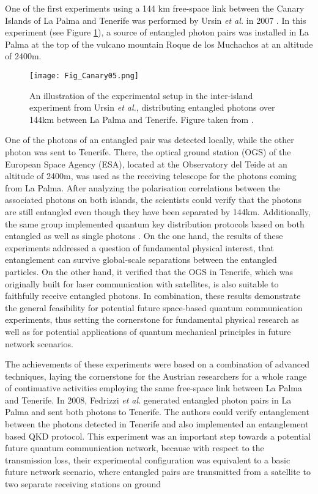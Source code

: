 \documentclass{article}
\begin{document}
One of the first experiments using a 144 km free-space link between the Canary Islands of La Palma and Tenerife was performed by Ursin \textit{et al.} in 2007 \cite{ursin2007entanglement}. In this experiment (see Figure \ref{fig:Fig_Canary05}), a source of entangled photon pairs was installed in La Palma at the top of the vulcano mountain Roque de los Muchachos at an altitude of 2400m.
\begin{figure}[h!]
\centering
\texttt{[image: Fig\_Canary05.png]}
\caption{An illustration of the experimental setup in the inter-island experiment from Ursin \textit{et al.}, distributing entangled photons over 144km between La Palma and Tenerife. Figure taken from \cite{ursin2007entanglement}.}
\label{fig:Fig_Canary05}
\end{figure}
One of the photons of an entangled pair was detected locally, while the other photon was sent to Tenerife. There, the optical ground station (OGS) of the European Space Agency (ESA), located at the Observatory del Teide at an altitude of 2400m, was used as the receiving telescope for the photons coming from La Palma. After analyzing the polarisation correlations between the associated photons on both islands, the scientists could verify that the photons are still entangled even though they have been separated by 144km. Additionally, the same group implemented quantum key distribution protocols based on both entangled as well as single photons \cite{ursin2007entanglement,schmitt2007experimental}. On the one hand, the results of these experiments addressed a question of fundamental physical interest, that entanglement can survive global-scale separations between the entangled particles. On the other hand, it verified that the OGS in Tenerife, which was originally built for laser communication with satellites, is also suitable to faithfully receive entangled photons. In combination, these results demonstrate the general feasibility for potential future space-based quantum communication experiments, thus setting the cornerstone for fundamental physical research as well as for potential applications of quantum mechanical principles in future network scenarios.

The achievements of these experiments were based on a combination of advanced techniques, laying the cornerstone for the Austrian researchers for a whole range of continuative activities employing the same free-space link between La Palma and Tenerife. In 2008, Fedrizzi \textit{et al.} \cite{fedrizzi2009high} generated entangled photon pairs in La Palma and sent both photons to Tenerife. The authors could verify entanglement between the photons detected in Tenerife and also implemented an entanglement based QKD protocol. This experiment was an important step towards a potential future quantum communication network, because with respect to the transmission loss, their experimental configuration was equivalent to a basic future network scenario, where entangled pairs are transmitted from a satellite to two separate receiving stations on ground
\end{document}
